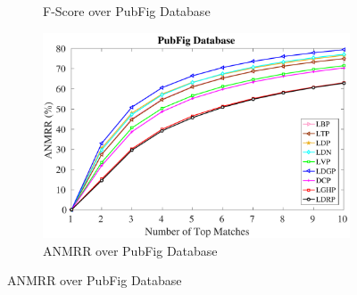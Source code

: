 \documentclass[a4paper]{article}
\begin{document}
\begin{figure}[!t]
\begin{subfigure}{.25\textwidth}
    \caption{F-Score over PubFig Database}
    \label{fig:pubfig-f}
  \end{subfigure}%
    \begin{subfigure}{.25\textwidth}
    \centering
    \includegraphics[width=.98\linewidth]{pubfig-anmrr}
    \caption{ANMRR over PubFig Database}
    \label{fig:pubfig-anmrr}
  \end{subfigure}
  \vspace{3mm}
  

\end{figure}
\end{document}
